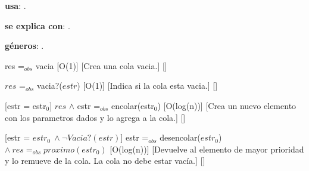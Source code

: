\begin{Interfaz}

  \textbf{usa}: .
  
  \textbf{se explica con}: .

  \textbf{g\'eneros}: .


  {res =$_{obs}$ vacia}%
  [O(1)]
  [Crea una cola vacia.]
  []

  {$res$ =$_{obs}$ vacia?($estr$)}%
  [O(1)]
  [Indica si la cola esta vacia.]
  []

  [estr = estr$_0$]
  {$res$ $\wedge$ estr =$_{obs}$ encolar(estr$_0$)}%
  [O(log(n))]
  [Crea un nuevo elemento con los parametros dados y lo agrega a la cola.]
  []

  [estr = $estr_0 \ \wedge \neg Vacia?(estr)$] 
  {estr =$_{obs}$ desencolar($estr_0$) $\wedge \ res =_{obs} proximo(estr_0)$}%
  [O(log(n))]
  [Devuelve al elemento de mayor prioridad y lo remueve de la cola. La cola no debe estar vac\'ia.]
  []
  
  
\end{Interfaz}

